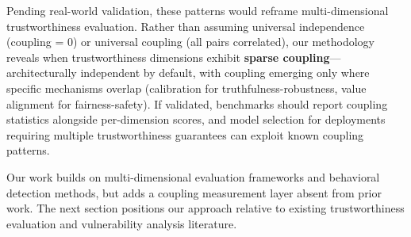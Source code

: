 Pending real-world validation, these patterns would reframe multi-dimensional trustworthiness evaluation. Rather than assuming universal independence (coupling = 0) or universal coupling (all pairs correlated), our methodology reveals when trustworthiness dimensions exhibit \textbf{sparse coupling}---architecturally independent by default, with coupling emerging only where specific mechanisms overlap (calibration for truthfulness-robustness, value alignment for fairness-safety). If validated, benchmarks should report coupling statistics alongside per-dimension scores, and model selection for deployments requiring multiple trustworthiness guarantees can exploit known coupling patterns.

Our work builds on multi-dimensional evaluation frameworks and behavioral detection methods, but adds a coupling measurement layer absent from prior work. The next section positions our approach relative to existing trustworthiness evaluation and vulnerability analysis literature.
